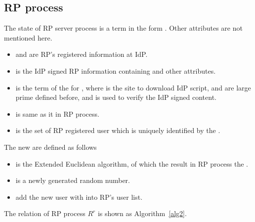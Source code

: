 \begin{appendices}
\subsection{RP process}
The state of RP server process is a term in the form . Other attributes are not mentioned here. 
\begin{itemize}
\item {} and  are RP's registered information at IdP.
\item {} is the IdP signed RP information containing  and other attributes.
\item {} is the term of the for , where  is the site to download IdP script,  and  are large prime defined before, and  is used to verify the IdP signed content.
\item {} is same as it in RP process.
\item {} is the set of RP registered user which is uniquely identified by the .
\end{itemize}
 The new  are defined as follows
 \begin{itemize}
 \item {} is the Extended Euclidean algorithm, of which the result in RP process the .
  \item {} is a newly generated random number.
  \item {} add the new user with  into RP's user list.
 \end{itemize}
The relation of RP process $R^r$ is shown as Algorithm~\ref{alg2}.


\end{appendices}
